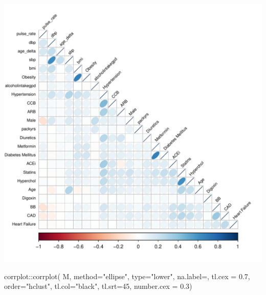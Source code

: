 \documentclass[
]{article}
\newenvironment{Shaded}{\begin{snugshade}}{\end{snugshade}}
\newcommand{\AttributeTok}[1]{\textcolor[rgb]{0.77,0.63,0.00}{#1}}
\newcommand{\DecValTok}[1]{\textcolor[rgb]{0.00,0.00,0.81}{#1}}
\newcommand{\FloatTok}[1]{\textcolor[rgb]{0.00,0.00,0.81}{#1}}
\newcommand{\FunctionTok}[1]{\textcolor[rgb]{0.00,0.00,0.00}{#1}}
\newcommand{\NormalTok}[1]{#1}
\newcommand{\SpecialCharTok}[1]{\textcolor[rgb]{0.00,0.00,0.00}{#1}}
\newcommand{\StringTok}[1]{\textcolor[rgb]{0.31,0.60,0.02}{#1}}
\begin{document}
\includegraphics{../results/report_files/figure-latex/feature-corr-plot-1.pdf}

\begin{Shaded}
\begin{Highlighting}[]
\NormalTok{corrplot}\SpecialCharTok{::}\FunctionTok{corrplot}\NormalTok{( M,}
                   \AttributeTok{method=}\StringTok{"ellipse"}\NormalTok{,}
                   \AttributeTok{type=}\StringTok{"lower"}\NormalTok{,}
                   \AttributeTok{na.label=}\StringTok{\textquotesingle{}{-}\textquotesingle{}}\NormalTok{, }
                   \AttributeTok{tl.cex =} \FloatTok{0.7}\NormalTok{, }
                   \AttributeTok{order=}\StringTok{"hclust"}\NormalTok{,}
                   \AttributeTok{tl.col=}\StringTok{"black"}\NormalTok{,}
                   \AttributeTok{tl.srt=}\DecValTok{45}\NormalTok{,}
                   \AttributeTok{number.cex =} \FloatTok{0.3}\NormalTok{) }
\end{Highlighting}
\end{Shaded}
\end{document}
